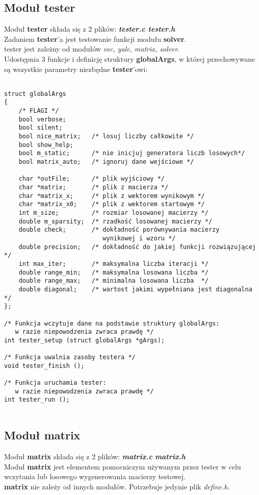 \documentclass[bibtotocnumbered, headsepline,normalheadings,12pt,polish]{scrreprt}
\begin{document}
\subsection{Moduł tester}
\normalsize
Moduł \textbf{tester} składa się z 2 plików: \textit{\textbf{tester.c tester.h}}\\
Zadaniem \textbf{tester}'a jest testowanie funkcji modułu \textbf{solver}.\\
tester jest zależny od \large{modułów \emph{vec, yale, matrix, solver}}.\normalsize\\
Udostępnia 3 funkcje i definicję struktury \textbf{globalArgs}, w której przechowywane są wszystkie parametry niezbędne \textbf{tester}'owi:\\
\small
\begin{verbatim}

struct globalArgs
{
    /* FLAGI */
    bool verbose;
    bool silent;
    bool nice_matrix;   /* losuj liczby całkowite */
    bool show_help;  
    bool m_static;      /* nie inicjuj generatora liczb losowych*/
    bool matrix_auto;   /* ignoruj dane wejściowe */

    char *outFile;      /* plik wyjściowy */
    char *matrix;       /* plik z macierza */
    char *matrix_x;     /* plik z wektorem wynikowym */
    char *matrix_x0;    /* plik z wektorem startowym */
    int m_size;         /* rozmiar losowanej macierzy */
    double m_sparsity;  /* rzadkość losowanej macierzy */
    double check;       /* dokładność porównywania macierzy 
                           wynikowej i wzoru */
    double precision;   /* dokładność do jakiej funkcji rozwiązującej */
    int max_iter;       /* maksymalna liczba iteracji */
    double range_min;   /* maksymalna losowana liczba */
    double range_max;   /* minimalna losowana liczba  */
    double diagonal;    /* wartost jakimi wypełniana jest diagonalna */
};

/* Funkcja wczytuje dane na podstawie struktury globalArgs: 
   w razie niepowodzenia zwraca prawdę */
int tester_setup (struct globalArgs *gArgs);

/* Funkcja uwalnia zasoby testera */
void tester_finish ();

/* Funkcja uruchamia tester: 
   w razie niepowodzenia zwraca prawdę */
int tester_run ();


\end{verbatim}


\subsection{Moduł matrix}
\normalsize
Moduł \textbf{matrix} składa się z 2 plików: \textit{\textbf{matrix.c} \textbf{matrix.h}}\\
Moduł \textbf{matrix} jest elementem pomocniczym używanym przez tester w celu wczytania lub losowego wygenerowania macierzy testowej.\\
\textbf{matrix} nie zależy od innych modułów. Potrzebuje jedynie plik \emph{define.h}.\\
\end{document}
